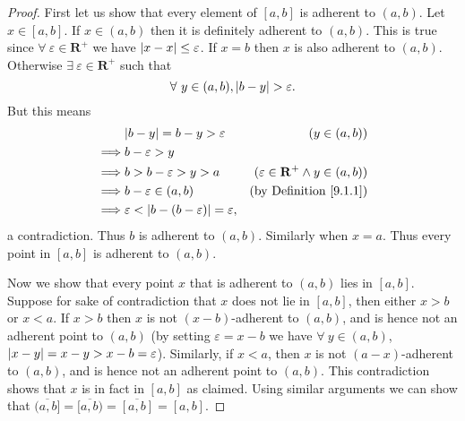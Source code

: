 \begin{proof}
    First let us show that every element of \([a, b]\) is adherent to \((a, b)\).
    Let \(x \in [a, b]\).
    If \(x \in (a, b)\) then it is definitely adherent to \((a, b)\).
    This is true since \(\forall\ \varepsilon \in \mathbf{R}^+\) we have \(\abs*{x - x} \leq \varepsilon\).
    If \(x = b\) then \(x\) is also adherent to \((a, b)\).
    Otherwise \(\exists\ \varepsilon \in \mathbf{R}^+\) such that
    \[
        \forall\ y \in (a, b), \abs*{b - y} > \varepsilon.
    \]
    But this means
    \begin{align*}
                 & \abs*{b - y} = b - y > \varepsilon                        & (y \in (a, b))                                    \\
        \implies & b - \varepsilon > y                                                                                           \\
        \implies & b > b - \varepsilon > y > a                               & (\varepsilon \in \mathbf{R}^+ \land y \in (a, b)) \\
        \implies & b - \varepsilon \in (a, b)                                & \text{(by Definition \ref{9.1.1})}                \\
        \implies & \varepsilon < \abs*{b - (b - \varepsilon)} = \varepsilon,
    \end{align*}
    a contradiction.
    Thus \(b\) is adherent to \((a, b)\).
    Similarly when \(x = a\).
    Thus every point in \([a, b]\) is adherent to \((a, b)\).

    Now we show that every point \(x\) that is adherent to \((a, b)\) lies in \([a, b]\).
    Suppose for sake of contradiction that \(x\) does not lie in \([a, b]\), then either \(x > b\) or \(x < a\).
    If \(x > b\) then \(x\) is not \((x - b)\)-adherent to \((a, b)\), and is hence not an adherent point to \((a, b)\)
    (by setting \(\varepsilon = x - b\) we have \(\forall\ y \in (a, b)\), \(\abs*{x - y} = x - y > x - b = \varepsilon\)).
    Similarly, if \(x < a\), then \(x\) is not \((a - x)\)-adherent to \((a, b)\), and is hence not an adherent point to \((a, b)\).
    This contradiction shows that \(x\) is in fact in \([a, b]\) as claimed.
    Using similar arguments we can show that \(\overline{(a, b]} = \overline{[a, b)} = \overline{[a, b]} = [a, b]\).


\end{proof}
